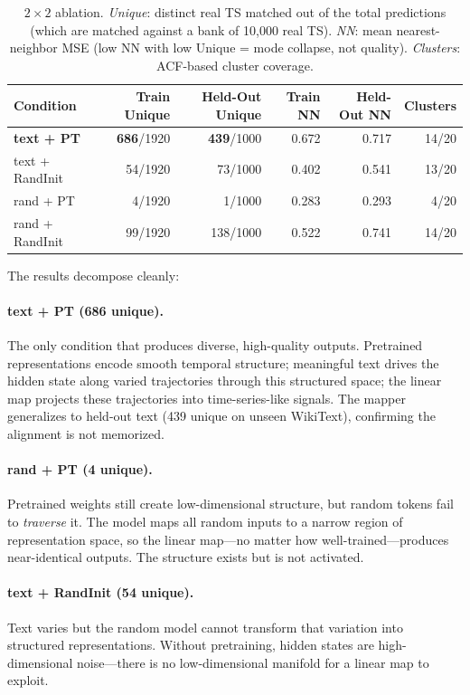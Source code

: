 \documentclass[11pt,a4paper]{article}
\begin{document}
\begin{table}[h]
\centering
\begin{tabular}{lrrrrr}
\toprule
Condition & Train Unique & Held-Out Unique & Train NN & Held-Out NN & Clusters \\
\midrule
\textbf{text + PT} & \textbf{686}/1920 & \textbf{439}/1000 & 0.672 & 0.717 & 14/20 \\
text + RandInit & 54/1920 & 73/1000 & 0.402 & 0.541 & 13/20 \\
rand + PT & 4/1920 & 1/1000 & 0.283 & 0.293 & 4/20 \\
rand + RandInit & 99/1920 & 138/1000 & 0.522 & 0.741 & 14/20 \\
\bottomrule
\end{tabular}
\caption{$2\times 2$ ablation. \textit{Unique}: distinct real TS matched out of the total predictions (which are matched against a bank of 10{,}000 real TS). \textit{NN}: mean nearest-neighbor MSE (low NN with low Unique = mode collapse, not quality). \textit{Clusters}: ACF-based cluster coverage.}
\label{tab:ablation}
\end{table}

The results decompose cleanly:

\paragraph{text + PT (686 unique).} The only condition that produces diverse, high-quality outputs. Pretrained representations encode smooth temporal structure; meaningful text drives the hidden state along varied trajectories through this structured space; the linear map projects these trajectories into time-series-like signals. The mapper generalizes to held-out text (439 unique on unseen WikiText), confirming the alignment is not memorized.

\paragraph{rand + PT (4 unique).} Pretrained weights still create low-dimensional structure, but random tokens fail to \textit{traverse} it. The model maps all random inputs to a narrow region of representation space, so the linear map---no matter how well-trained---produces near-identical outputs. The structure exists but is not activated.

\paragraph{text + RandInit (54 unique).} Text varies but the random model cannot transform that variation into structured representations. Without pretraining, hidden states are high-dimensional noise---there is no low-dimensional manifold for a linear map to exploit.
\end{document}
